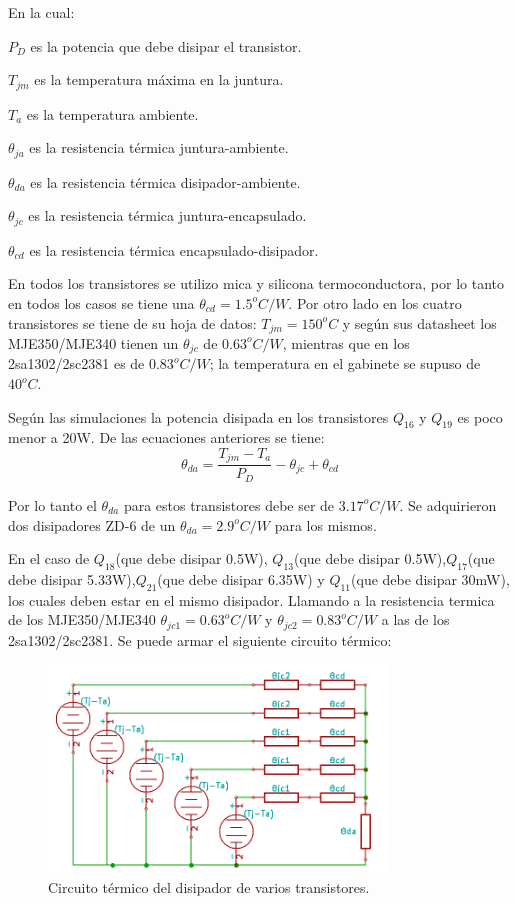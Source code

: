 En la cual:
\begin{list}{ }
\item $P_D$  es la potencia que debe disipar el transistor.
\item $T_{jm}$ es la temperatura máxima en la juntura.
\item  $T_a$ es la temperatura ambiente.
\item  $\theta_{ja}$ es la resistencia térmica juntura-ambiente.
\item  $\theta_{da}$ es la resistencia térmica disipador-ambiente.
\item  $\theta_{jc}$ es la resistencia térmica juntura-encapsulado.
\item  $\theta_{cd}$ es la resistencia térmica encapsulado-disipador.
\end{list}
En todos los transistores se utilizo mica y silicona termoconductora, por lo tanto en todos los casos se tiene una $\theta_{cd}=1.5^oC/W$.
Por otro lado en los cuatro transistores se tiene de su hoja de datos: $T_{jm}=150^oC$ y según sus datasheet los MJE350/MJE340 tienen un $\theta_{jc}$ de $0.63^oC/W$, mientras que en los 2sa1302/2sc2381 es de $0.83^oC/W$; la temperatura en el gabinete se supuso de $40^oC$.

Según las simulaciones la potencia disipada en los transistores $Q_{16}$ y $Q_{19}$ es poco menor a 20W. De las ecuaciones anteriores se tiene:
$$
	\theta_{da}=\dfrac{T_{jm}-T_a}{P_D} - \theta_{jc}+\theta_{cd}
$$

Por lo tanto el $\theta_{da}$ para estos transistores debe ser de $3.17^oC/W$. Se adquirieron dos disipadores ZD-6 de un  $\theta_{da}=2.9^oC/W$ para los mismos.

En el caso de $Q_{18}$(que debe disipar 0.5W), $Q_{13}$(que debe disipar 0.5W),$Q_{17}$(que debe disipar 5.33W),$Q_{21}$(que debe disipar 6.35W) y $Q_{11}$(que debe disipar 30mW), los cuales deben estar en el mismo disipador.
Llamando a la resistencia termica de los MJE350/MJE340 $\theta_{jc1}=0.63^oC/W$ y $\theta_{jc2}=0.83^oC/W$ a las de los 2sa1302/2sc2381. Se puede armar el siguiente circuito térmico:

\begin{figure}[H]
\centerline{
\includegraphics[width=0.8\textwidth]{img/disipador_cir.png}}
\caption{Circuito térmico del disipador de varios transistores.}
\end{figure}

